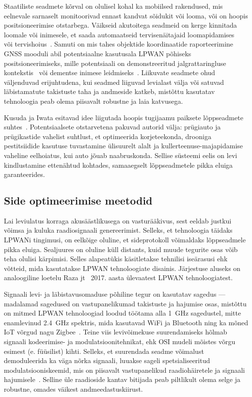 \documentclass[12pt]{article}
\begin{document}
Staatiliste seadmete kõrval on olulisel kohal ka mobiilsed rakendused, mis eelnevale sarnaselt monitoorivad ennast kandvat sõidukit või looma, või on hoopis positsioneerimise otstarbega.
Väikseid akutoitega seadmeid on kerge kinnitada loomale või inimesele, et saada automaatseid tervisenäitajaid loomapidamises~\cite{germani, liliu} või tervishoius~\cite{olatinwo, petajajarvi}.
Samuti on mis tahes objektide koordinaatide raporteerimine GNSS mooduli abil potentsiaalne kasutusala LPWAN põhiseks positsioneerimiseks, mille potentsiaali on demonstreeritud jalgrattaringluse kontekstis~\cite{kimpark} või dementse inimese leidmiseks~\cite{hadwen}.
Liikuvate seadmete ohud väljenduvad erijuhtudena, kui seadmed liiguvad levialast välja või satuvad läbistamatute takistuste taha ja andmeside katkeb, mistõttu kasutatav tehnoloogia peab olema piisavalt robustne ja laia katvusega.

Kusuda ja Iwata esitavad idee liigutada hoopis tugijaamu paiksete lõppseadmete suhtes~\cite{kusuda}.
Potentsiaalsete otstarvetena pakuvad autorid välja: prügiauto ja prügikastide vahelist suhtlust, et optimeerida korjeteekonda, drooniga pestitsiidide kasutuse tuvastamine ülisuurelt alalt ja kullerteenuse-majapidamise vaheline eelhoiatus, kui auto jõuab naabruskonda.
Sellise süsteemi eelis on levi kindlustamine ettenähtud kohtades, samaaegselt lõppseadmetele pikka eluiga garanteerides.

\subsection{Side optimeerimise meetodid}

Lai leviulatus korraga akusäästlikusega on vasturääkivus, sest eeldab justkui võimsa ja kuluka raadiosignaali genereerimist.
Selleks, et tehnoloogia täidaks LPWANi tingimusi, on eelkõige oluline, et sideprotokoll võimaldaks lõppseadmele pikka eluiga.
Sealjuures on oluline küll distants, kuid muude tegurite osas võib teha olulisi kärpimisi.
Selles alapeatükis käsitletakse tehnilisi iseärasusi ehk võtteid, mida kasutatakse LPWAN tehnoloogiate disainis.
Järjestuse aluseks on analoogiline loetelu Raza jt~\cite{raza} 2017. aasta ülevaatest LPWAN tehnoloogiatest.

Signaali levi- ja läbistavusomaduse põhiline tegur on kasutatav sagedus — madalamad sagedused on vastupanelikumad takistuste ja hajumise osas, mistõttu on mitmed LPWAN tehnoloogiad loodud töötama alla \SI{1}{\giga\hertz} sagedustel, mitte enamlevinud \SI{2,4}{\giga\hertz} spektris, mida kasutavad WiFi ja Bluetooth ning ka mõned IoT võrgud nagu Zigbee~\cite{bardyn}.
Teine viis levivõimekuse suurendamiseks hõlmab signaali kodeerimise- ja modulatsioonitehnikat, ehk OSI mudeli mõistes võrgu esimest (e. füüsilist) kihti. Selleks, et suurendada seadme võimalust demoduleerida ka väga nõrka signaali, luuakse sageli spetsialiseeritud modulatsiooniskeemid, mis on piisavalt vastupanelikud raadiohäiretele ja signaali hajumisele~\cite{reynders}.
Selline üle raadioside kantav bitijada peab piltlikult olema selge ja robustne, omades väikest andmeedastuskiirust.
\end{document}
